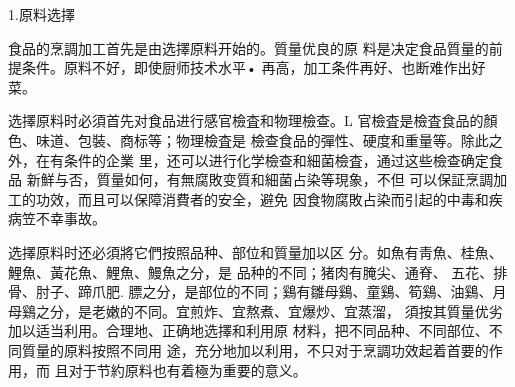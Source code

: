 1.原料选擇

食品的烹調加工首先是由选擇原料开始的。質量优良的原 料是决定食品質量的前提条件。原料不好，即使厨师技术水平• 再高，加工条件再好、也断难作出好菜。

选擇原料时必須首先对食品进行感官檢査和物理檢查。L 官檢査是檢査食品的顏色、味道、包裝、商标等；物理檢査是 檢查食品的彈性、硬度和重量等。除此之外，在有条件的企業 里，还可以进行化学檢查和細菌檢査，通过这些檢查确定食品 新鮮与否，質量如何，有無腐敗变質和細菌占染等現象，不但 可以保証烹調加工的功效，而且可以保障消費者的安全，避免 因食物腐敗占染而引起的中毒和疾病笠不幸事故。

选擇原料时还必須將它們按照品种、部位和質量加以区 分。如魚有靑魚、桂魚、鯉魚、黃花魚、鯉魚、鰻魚之分，是 品种的不同；猪肉有腌尖、通脊、
五花、排骨、肘子、蹄爪肥. 膘之分，是部位的不同；鷄有雛母鷄、童鷄、筍鷄、油鷄、月 母鷄之分，是老嫩的不同。宜煎炸、宜熬煮、宜爆炒、宜蒸溜， 須按其質量优劣加以适当利用。合理地、正确地选擇和利用原 材料，把不同品种、不同部位、不同質量的原料按照不同用 途，充分地加以利用，不只对于烹調功效起着首要的作用，而 且对于节約原料也有着極为重要的意义。
